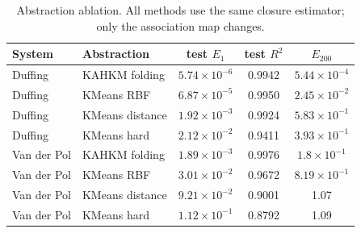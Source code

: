 \begin{table}[t]
\centering
\small
\caption{Abstraction ablation. All methods use the same closure estimator; only the association map changes.}
\label{tab:ablation}
\begin{tabular}{llccc}
\toprule
System & Abstraction & test $E_1$ & test $R^2$ & $E_{200}$ \\
\midrule
Duffing & KAHKM folding & $5.74\times10^{-6}$ & 0.9942 & $5.44\times10^{-4}$ \\
Duffing & KMeans RBF & $6.87\times10^{-5}$ & 0.9950 & $2.45\times10^{-2}$ \\
Duffing & KMeans distance & $1.92\times10^{-3}$ & 0.9924 & $5.83\times10^{-1}$ \\
Duffing & KMeans hard & $2.12\times10^{-2}$ & 0.9411 & $3.93\times10^{-1}$ \\
\midrule
Van der Pol & KAHKM folding & $1.89\times10^{-3}$ & 0.9976 & $1.8\times10^{-1}$ \\
Van der Pol & KMeans RBF & $3.01\times10^{-2}$ & 0.9672 & $8.19\times10^{-1}$ \\
Van der Pol & KMeans distance & $9.21\times10^{-2}$ & 0.9001 & 1.07 \\
Van der Pol & KMeans hard & $1.12\times10^{-1}$ & 0.8792 & 1.09 \\
\bottomrule
\end{tabular}
\end{table}
